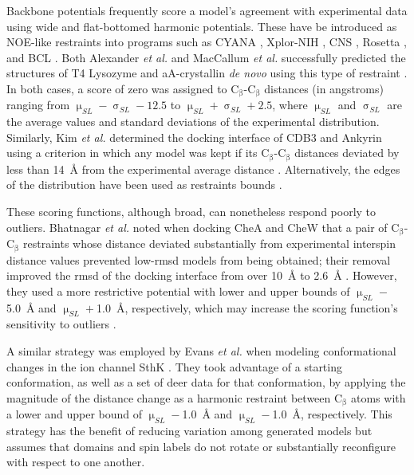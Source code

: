 Backbone potentials frequently score a model's agreement with experimental data using wide and flat-bottomed harmonic potentials. These have be introduced as NOE-like restraints into programs such as CYANA \citep*{Guentert2004}, Xplor-NIH \citep*{Schwieters2003}, CNS \citep*{Brunger1998}, Rosetta \citep*{Leaver-fay2011, Leman2020, Simons1997}, and BCL \citep*{Karakas2012, Woetzel2012}. Both Alexander \emph{et al.} and MacCallum \emph{et al.} successfully predicted the structures of T4 Lysozyme and aA-crystallin \emph{de novo} using this type of restraint \citep*{Alexander2008, MacCallum2015}. In both cases, a score of zero was assigned to $\mathrm{C_{\upbeta}}$-$\mathrm{C_{\upbeta}}$ distances (in angstroms) ranging from $\upmu_\mathit{SL} - \upsigma_\mathit{SL} - 12.5$ to  $\upmu_\mathit{SL} + \upsigma_\mathit{SL} + 2.5$, where $\upmu_\mathit{SL}$ and $\upsigma_\mathit{SL}$ are the average values and standard deviations of the experimental distribution. Similarly, Kim \emph{et al.} determined the docking interface of CDB3 and Ankyrin using a criterion in which any model was kept if its $\mathrm{C_{\upbeta}}$-$\mathrm{C_{\upbeta}}$ distances deviated by less than \SI{14}{\angstrom} from the experimental average distance \citep*{Kim2011}. Alternatively, the edges of the distribution have been used as restraints bounds \citep*{Bibow2017}.

These scoring functions, although broad, can nonetheless respond poorly to outliers. Bhatnagar \emph{et al.} noted when docking CheA and CheW that a pair of $\mathrm{C_{\upbeta}}$-$\mathrm{C_{\upbeta}}$ restraints whose distance deviated substantially from experimental interspin distance values prevented low-\gls{rmsd} models from being obtained; their removal improved the \gls{rmsd} of the docking interface from over \SI{10}{\angstrom} to \SI{2.6}{\angstrom} \citep*{Bhatnagar2007}. However, they used a more restrictive potential with lower and upper bounds of $\upmu_\mathit{SL} -$\SI{5.0}{\angstrom} and $\upmu_\mathit{SL} +$\SI{1.0}{\angstrom}, respectively, which may increase the scoring function's sensitivity to outliers \citep*{Bhatnagar2010}.

A similar strategy was employed by Evans \emph{et al.} when modeling conformational changes in the ion channel SthK \citep*{Evans2020}. They took advantage of a starting conformation, as well as a set of \gls{deer} data for that conformation, by applying the magnitude of the distance change as a harmonic restraint between $\mathrm{C_{\upbeta}}$ atoms with a lower and upper bound of $\upmu_\mathit{SL} -$\SI{1.0}{\angstrom} and $\upmu_\mathit{SL} -$\SI{1.0}{\angstrom}, respectively. This strategy has the benefit of reducing variation among generated models but assumes that domains and spin labels do not rotate or substantially reconfigure with respect to one another.

